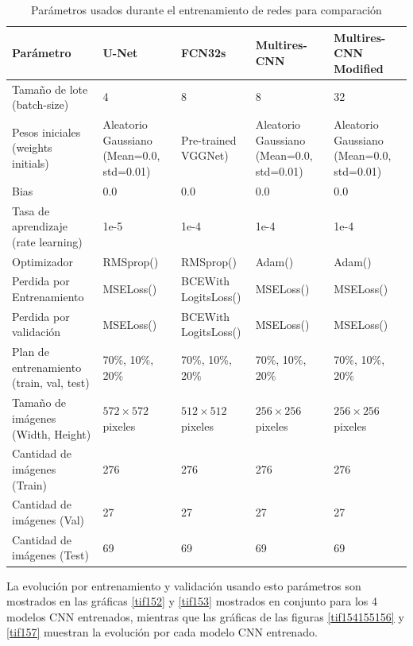 \documentclass[10pt,letterpaper]{article}
\begin{document}
\begin{table}[H]
\begin{center}
\begin{tabular}{ p{2.5cm}  p{1.5cm}  p{1.5cm}  p{1.7cm}  p{2.3cm} }
\hline
Parámetro & U-Net & FCN32s & Multires-CNN & Multires-CNN Modified\\	
\hline
Tamaño de lote (batch-size) & 4    & 8 & 8 & 32 \\
\hline
Pesos iniciales (weights initials) & Aleatorio Gaussiano (Mean=0.0, std=0.01)  
								   & Pre-trained VGGNet) 
								   & Aleatorio Gaussiano (Mean=0.0, std=0.01) 
								   & Aleatorio Gaussiano (Mean=0.0, std=0.01) \\
\hline
Bias                       & 0.0  & 0.0 & 0.0 & 0.0 \\
\hline
Tasa de aprendizaje (rate learning) & 1e-5  & 1e-4 & 1e-4 & 1e-4 \\
\hline
Optimizador                & RMSprop()   & RMSprop() & Adam() & Adam() \\
\hline
Perdida por Entrenamiento         & MSELoss() & BCEWith
LogitsLoss() & MSELoss() & MSELoss() \\
\hline
Perdida por validación         & MSELoss() & BCEWith
LogitsLoss() & MSELoss() & MSELoss() \\
\hline
Plan de entrenamiento (train, val, test)& 70\%, 10\%, 20\%  & 70\%, 10\%, 20\% & 70\%, 10\%, 20\% & 70\%, 10\%, 20\% \\
\hline
Tamaño de imágenes (Width, Height)        & $572\times572$  pixeles & $512\times512$ pixeles & $256\times256$ pixeles & $256\times256$ pixeles \\
\hline
Cantidad de imágenes (Train) & 276  & 276 & 276 & 276 \\
\hline
Cantidad de imágenes (Val)   & 27  & 27 & 27 & 27 \\
\hline
Cantidad de imágenes (Test)  & 69  & 69 & 69 & 69 \\
\hline
\end{tabular}
\caption{Parámetros usados durante el entrenamiento de redes para comparación}
\label{Parametroscomparacion}
\end{center}
\end{table}

La evolución por entrenamiento y validación usando esto parámetros son mostrados en las gráficas \ref{tif152} y \ref{tif153} mostrados en conjunto para los 4 modelos CNN entrenados, mientras que las gráficas de las figuras \ref{tif154155156} y \ref{tif157} muestran la evolución por cada modelo CNN entrenado.
\end{document}
